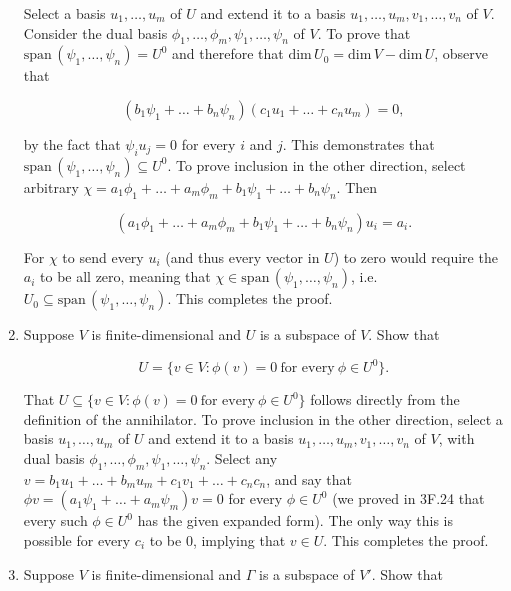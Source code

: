 \documentclass{book}
\begin{document}
\begin{enumerate}
Select a basis \(u_1,\dots,u_m\) of \(U\) and extend it to a basis \(u_1,\dots,u_m,v_1,\dots,v_n\) of \(V\).  Consider the dual basis \(\phi_1,\dots,\phi_m,\psi_1,\dots,\psi_n\) of \(V\).  To prove that \(\text{span} \, (\psi_1,\dots,\psi_n)=U^0\) and therefore that \(\text{dim} \, U_0=\text{dim} \, V-\text{dim} \, U\), observe that

\begin{equation*}
    (b_1\psi_1+\dots+b_n\psi_n)(c_1u_1+\dots+c_nu_m)=0,
\end{equation*}

by the fact that \(\psi_iu_j=0\) for every \(i\) and \(j\).  This demonstrates that \(\text{span} \, (\psi_1,\dots,\psi_n) \subseteq U^0\).  To prove inclusion in the other direction, select arbitrary \(\chi=a_1\phi_1+\dots+a_m\phi_m+b_1\psi_1+\dots+b_n\psi_n\).  Then

\begin{equation*}
    (a_1\phi_1+\dots+a_m\phi_m+b_1\psi_1+\dots+b_n\psi_n)u_i = a_i.
\end{equation*}

For \(\chi\) to send every \(u_i\) (and thus every vector in \(U\)) to zero would require the \(a_i\) to be all zero, meaning that \(\chi \in \text{span} \, (\psi_1,\dots,\psi_n)\), i.e. \(U_0 \subseteq \text{span} \, (\psi_1,\dots,\psi_n)\).  This completes the proof.

\item Suppose \(V\) is finite-dimensional and \(U\) is a subspace of \(V\).  Show that

\begin{equation*}
    U=\{v \in V:\phi(v)=0 \ \text{for every} \ \phi \in U^0\}.
\end{equation*}

That \(U \subseteq \{v \in V:\phi(v)=0 \ \text{for every} \ \phi \in U^0\}\) follows directly from the definition of the annihilator.  To prove inclusion in the other direction, select a basis \(u_1,\dots,u_m\) of \(U\) and extend it to a basis \(u_1,\dots,u_m,v_1,\dots,v_n\) of \(V\), with dual basis \(\phi_1,\dots,\phi_m,\psi_1,\dots,\psi_n\).  Select any \(v=b_1u_1+\dots+b_mu_m+c_1v_1+\dots+c_nc_n\), and say that \(\phi v=(a_1\psi_1+\dots+a_m\psi_m)v=0\) for every \(\phi \in U^0\) (we proved in 3F.24 that every such \(\phi \in U^0\) has the given expanded form).  The only way this is possible for every \(c_i\) to be \(0\), implying that \(v \in U\).  This completes the proof.

\item Suppose \(V\) is finite-dimensional and \(\Gamma\) is a subspace of \(V'\).  Show that


\end{enumerate}
\end{document}
